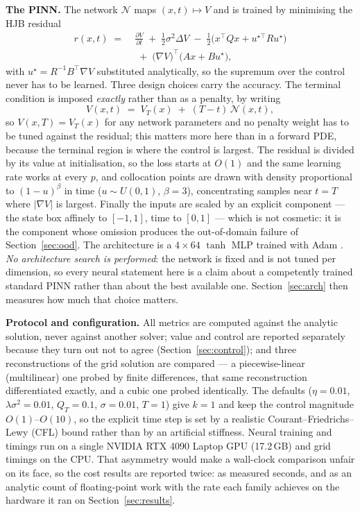 \documentclass[conference]{IEEEtran}
\begin{document}
\textbf{The PINN.} The network $\mathcal{N}$ maps $(x,t)\mapsto V$ and is trained by minimising
the HJB residual
\begin{equation}
\begin{split}
r(x,t) \;=\; & \frac{\partial V}{\partial t} \;+\; \frac{1}{2}\sigma^{2}\Delta V
   \;-\; \tfrac12\big(x^\top Q x + u^{\star\top} R u^{\star}\big) \\
   & \;+\; \big(\nabla V\big)^\top\!\big(Ax + Bu^{\star}\big),
\end{split}
\end{equation}
with $u^{\star}=R^{-1}B^\top\nabla V$ substituted analytically, so the supremum over the control
never has to be learned. Three design choices carry the accuracy. The terminal condition is imposed
\emph{exactly} rather than as a penalty, by writing
\begin{equation}
V(x,t) \;=\; V_T(x) \;+\; (T-t)\,\mathcal{N}(x,t),
\end{equation}
so $V(x,T)=V_T(x)$ for any network parameters and no penalty weight has to be tuned against the
residual; this matters more here than in a forward PDE, because the terminal region is where the
control is largest. The residual is divided by its value at initialisation, so the loss starts at
$O(1)$ and the same learning rate works at every $p$, and collocation points are drawn with density
proportional to $(1-u)^{\beta}$ in time ($u\sim U(0,1)$, $\beta=3$), concentrating samples near
$t=T$ where $|\nabla V|$ is largest. Finally the inputs are scaled by an explicit component --- the
state box affinely to $[-1,1]$, time to $[0,1]$ --- which is not cosmetic: it is the component
whose omission produces the out-of-domain failure of Section~\ref{sec:ood}. The architecture is a
$4\times64$ $\tanh$ MLP trained with Adam \cite{kingma2015adam}. \emph{No architecture search is
performed}: the network is fixed and is not tuned per dimension, so every neural statement here is a
claim about a competently trained standard PINN rather than about the best available one.
Section~\ref{sec:arch} then measures how much that choice matters.

\textbf{Protocol and configuration.} All metrics are computed against the analytic solution, never
against another solver; value and control are reported separately because they turn out not to agree
(Section~\ref{sec:control}); and three reconstructions of the grid solution are compared --- a
piecewise-linear (multilinear) one probed by finite differences, that same reconstruction
differentiated exactly, and a cubic one probed identically. The defaults
($\eta = 0.01$, $\lambda\sigma^2 = 0.01$, $Q_T = 0.1$, $\sigma = 0.01$, $T=1$) give $k=1$ and keep
the control magnitude $O(1)$--$O(10)$, so the explicit time step is set by a realistic
Courant--Friedrichs--Lewy (CFL) bound rather than by an artificial stiffness. Neural training and
timings run on a single NVIDIA RTX 4090 Laptop GPU (17.2\,GB) and grid timings on the CPU. That
asymmetry would make a wall-clock comparison unfair on its face, so the cost results are reported
twice: as measured seconds, and as an analytic count of floating-point work with the rate each family
achieves on the hardware it ran on Section~\ref{sec:results}.
\end{document}

